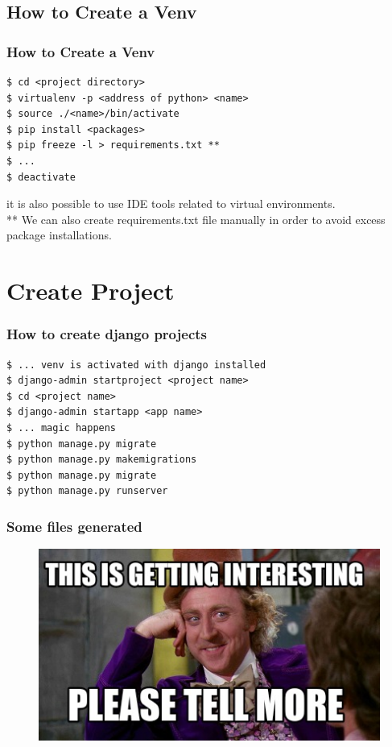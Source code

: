 \documentclass{beamer}
\begin{document}
\subsection{How to Create a Venv}
\begin{frame}[fragile]
\frametitle{How to Create a Venv}
\lstset{language=Bash}         
\begin{lstlisting}[frame=single]
$ cd <project directory>
$ virtualenv -p <address of python> <name>
$ source ./<name>/bin/activate
$ pip install <packages>
$ pip freeze -l > requirements.txt **
$ ...
$ deactivate
\end{lstlisting}
it is also possible to use IDE tools related to virtual environments.
\\ ** We can also create requirements.txt file manually in order to avoid excess package installations.
\end{frame}

\section{Create Project}
\begin{frame}[fragile]
\frametitle{How to create django projects}
\lstset{language=Bash}         
\begin{lstlisting}[frame=single]
$ ... venv is activated with django installed
$ django-admin startproject <project name>
$ cd <project name>
$ django-admin startapp <app name>
$ ... magic happens
$ python manage.py migrate
$ python manage.py makemigrations
$ python manage.py migrate
$ python manage.py runserver
\end{lstlisting}
\end{frame}

\begin{frame}
	\frametitle{Some files generated}
	\begin{figure}
		\includegraphics[width=0.7\linewidth]{Pics/h69E992E0.jpeg}
	\end{figure}
\end{frame}
\end{document}
